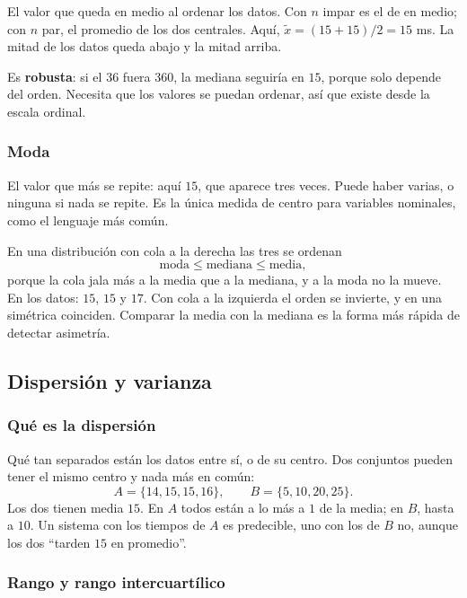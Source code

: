 \documentclass[11pt,letterpaper]{article}
\begin{document}
El valor que queda en medio al ordenar los datos. Con $n$ impar es el
de en medio; con $n$ par, el promedio de los dos centrales. Aquí,
$\tilde{x} = (15 + 15)/2 = 15$ ms. La mitad de los datos queda abajo y
la mitad arriba.

Es \textbf{robusta}: si el $36$ fuera $360$, la mediana seguiría en
$15$, porque solo depende del orden. Necesita que los valores se
puedan ordenar, así que existe desde la escala ordinal.

\subsubsection*{Moda}

El valor que más se repite: aquí $15$, que aparece tres veces. Puede
haber varias, o ninguna si nada se repite. Es la única medida de
centro para variables nominales, como el lenguaje más común.

\begin{idea}
    En una distribución con cola a la derecha las tres se ordenan
    \[
        \text{moda} \leq \text{mediana} \leq \text{media} ,
    \]
    porque la cola jala más a la media que a la mediana, y a la moda
    no la mueve. En los datos: $15$, $15$ y $17$. Con cola a la
    izquierda el orden se invierte, y en una simétrica coinciden.
    Comparar la media con la mediana es la forma más rápida de
    detectar asimetría.
\end{idea}


\subsection*{Dispersión y varianza}

\subsubsection*{Qué es la dispersión}

Qué tan separados están los datos entre sí, o de su centro. Dos
conjuntos pueden tener el mismo centro y nada más en común:
\[
    A = \{14, 15, 15, 16\} , \qquad B = \{5, 10, 20, 25\} .
\]
Los dos tienen media $15$. En $A$ todos están a lo más a $1$ de la
media; en $B$, hasta a $10$. Un sistema con los tiempos de $A$ es
predecible, uno con los de $B$ no, aunque los dos ``tarden $15$ en
promedio''.

\subsubsection*{Rango y rango intercuartílico}
\end{document}

